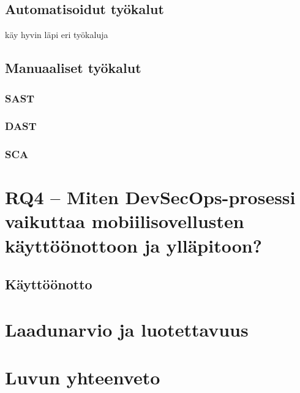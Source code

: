\documentclass[bscthesis,finnish,oneside,biblatex]{uefcsthesis}
\begin{document}
\subsection{Automatisoidut työkalut}

\cite{feio2024_empirical} käy hyvin läpi eri työkaluja

\subsection{Manuaaliset työkalut}

\subsubsection{SAST}

\subsubsection{DAST}

\subsubsection{SCA}

\section{RQ4 – Miten DevSecOps-prosessi vaikuttaa mobiilisovellusten käyttöönottoon ja ylläpitoon?}
\label{sec:rq4}


\subsection{Käyttöönotto}

\section{Laadunarvio ja luotettavuus}

\section{Luvun yhteenveto}
\end{document}
